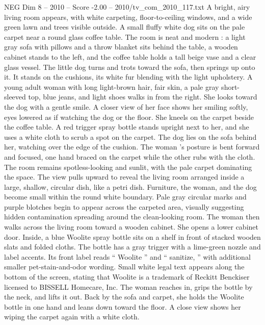 \begin{textsample}{NEG Dim 8 – 2010 – Score -2.00 – 2010/tv\_com\_2010\_117.txt}  \label{ex:f8_neg_074}
A bright, airy living room appears, with white carpeting, floor-to-ceiling windows, and a wide green lawn and trees visible outside.
A small fluffy white dog sits on the pale carpet near a round glass coffee table.
The room is neat and modern : a light gray sofa with pillows and a throw blanket sits behind the table, a wooden cabinet stands to the left, and the coffee table holds a tall beige vase and a clear glass vessel.
The little dog turns and trots toward the sofa, then springs up onto it.
It stands on the cushions, its white fur blending with the light upholstery.
A young adult woman with long light-brown hair, fair skin, a pale gray short-sleeved top, blue jeans, and light shoes walks in from the right.
She looks toward the dog with a gentle smile.
A closer view of her face shows her smiling softly, eyes lowered as if watching the dog or the floor.
She kneels on the carpet beside the coffee table.
A red trigger spray bottle stands upright next to her, and she uses a white cloth to scrub a spot on the carpet.
The dog lies on the sofa behind her, watching over the edge of the cushion.
The woman ’s posture is bent forward and focused, one hand braced on the carpet while the other rubs with the cloth.
The room remains spotless-looking and sunlit, with the pale carpet dominating the space.
The view pulls upward to reveal the living room arranged inside a large, shallow, circular dish, like a petri dish.
Furniture, the woman, and the dog become small within the round white boundary.
Pale gray circular marks and purple blotches begin to appear across the carpeted area, visually suggesting hidden contamination spreading around the clean-looking room.
The woman then walks across the living room toward a wooden cabinet.
She opens a lower cabinet door.
Inside, a blue Woolite spray bottle sits on a shelf in front of stacked wooden slats and folded cloths.
The bottle has a gray trigger with a lime-green nozzle and label accents.
Its front label reads “ Woolite ” and “ sanitize, ” with additional smaller pet-stain-and-odor wording.
Small white legal text appears along the bottom of the screen, stating that Woolite is a trademark of Reckitt Benckiser licensed to BISSELL Homecare, Inc.
The woman reaches in, grips the bottle by the neck, and lifts it out.
Back by the sofa and carpet, she holds the Woolite bottle in one hand and leans down toward the floor.
A close view shows her wiping the carpet again with a white cloth.

\end{textsample}

